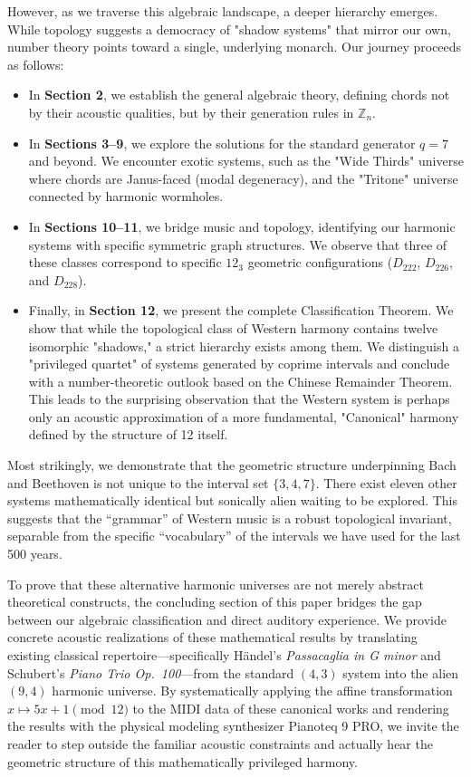 \documentclass[12pt,letterpaper]{amsart}
\begin{document}
However, as we traverse this algebraic landscape, a deeper hierarchy emerges. While topology suggests a democracy of "shadow systems" that mirror our own, number theory points toward a single, underlying monarch. Our journey proceeds as follows:
\begin{itemize}
    \item In \textbf{Section 2}, we establish the general algebraic theory, defining chords not by their acoustic qualities, but by their generation rules in $\mathbb{Z}_{n}$.
    \item In \textbf{Sections 3--9}, we explore the solutions for the standard generator $q=7$ and beyond. We encounter exotic systems, such as the "Wide Thirds" universe where chords are Janus-faced (modal degeneracy), and the "Tritone" universe connected by harmonic wormholes.
    \item In \textbf{Sections 10--11}, we bridge music and topology, identifying our harmonic systems with specific symmetric graph structures. We observe that three of these classes correspond to specific $12_3$ geometric configurations ($D_{222}$, $D_{226}$, and $D_{228}$).
    \item Finally, in \textbf{Section 12}, we present the complete Classification Theorem. We show that while the topological class of Western harmony contains twelve isomorphic "shadows," a strict hierarchy exists among them. We distinguish a "privileged quartet" of systems generated by coprime intervals and conclude with a number-theoretic outlook based on the Chinese Remainder Theorem. This leads to the surprising observation that the Western system is perhaps only an acoustic approximation of a more fundamental, "Canonical" harmony defined by the structure of 12 itself.
\end{itemize}


Most strikingly, we demonstrate that the geometric structure underpinning Bach and Beethoven is not unique to the interval set $\{3,4,7\}$. There exist eleven other systems mathematically identical but sonically alien waiting to be explored. This suggests that the ``grammar'' of Western music is a robust topological invariant, separable from the specific ``vocabulary'' of the intervals we have used for the last 500 years.

To prove that these alternative harmonic universes are not merely abstract theoretical constructs, the concluding section of this paper bridges the gap between our algebraic classification and direct auditory experience. We provide concrete acoustic realizations of these mathematical results by translating existing classical repertoire---specifically Händel's \textit{Passacaglia in G minor} and Schubert's \textit{Piano Trio Op.~100}---from the standard $(4,3)$ system into the alien $(9,4)$ harmonic universe. By systematically applying the affine transformation $x \mapsto 5x + 1 \pmod{12}$ to the MIDI data of these canonical works and rendering the results with the physical modeling synthesizer Pianoteq 9 PRO, we invite the reader to step outside the familiar acoustic constraints and actually hear the geometric structure of this mathematically privileged harmony.
\end{document}
